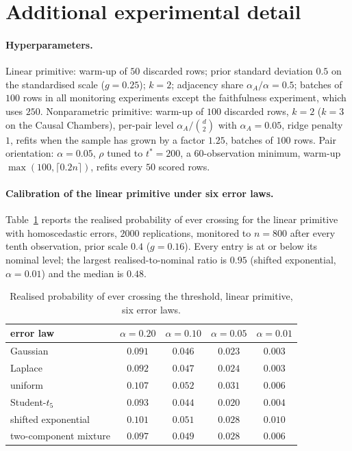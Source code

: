 \section{Additional experimental detail}\label{app:extra}

\paragraph{Hyperparameters.} Linear primitive: warm-up of $50$ discarded rows;
prior standard deviation $0.5$ on the standardised scale ($g=0.25$); $k=2$;
adjacency share $\alpha_A/\alpha=0.5$; batches of $100$ rows in all monitoring
experiments except the faithfulness experiment, which uses $250$. Nonparametric
primitive: warm-up of $100$ discarded rows, $k=2$ ($k=3$ on the Causal Chambers),
per-pair level $\alpha_A/\binom d2$ with $\alpha_A=0.05$, ridge penalty $1$,
refits when the sample has grown by a factor $1.25$, batches of $100$ rows. Pair
orientation: $\alpha=0.05$, $\rho$ tuned to $t^\ast=200$, a $60$-observation
minimum, warm-up $\max(100,\lceil0.2n\rceil)$, refits every $50$ scored rows.

\paragraph{Calibration of the linear primitive under six error laws.}
Table~\ref{tab:primitive} reports the realised probability of ever crossing for
the linear primitive with homoscedastic errors, $2000$ replications, monitored to
$n=800$ after every tenth observation, prior scale $0.4$ ($g=0.16$). Every entry is
at or below its nominal level; the largest realised-to-nominal ratio is $0.95$
(shifted exponential, $\alpha=0.01$) and the median is $0.48$.

\begin{table}[h]
\centering
\caption{Realised probability of ever crossing the threshold, linear primitive,
six error laws.}\label{tab:primitive}
\small
\begin{tabular}{@{}lcccc@{}}
\toprule
error law & $\alpha=0.20$ & $\alpha=0.10$ & $\alpha=0.05$ & $\alpha=0.01$ \\
\midrule
Gaussian & $0.091$ & $0.046$ & $0.023$ & $0.003$ \\
Laplace & $0.092$ & $0.047$ & $0.024$ & $0.003$ \\
uniform & $0.107$ & $0.052$ & $0.031$ & $0.006$ \\
Student-$t_5$ & $0.093$ & $0.044$ & $0.020$ & $0.004$ \\
shifted exponential & $0.101$ & $0.051$ & $0.028$ & $0.010$ \\
two-component mixture & $0.097$ & $0.049$ & $0.028$ & $0.006$ \\
\bottomrule
\end{tabular}
\end{table}


